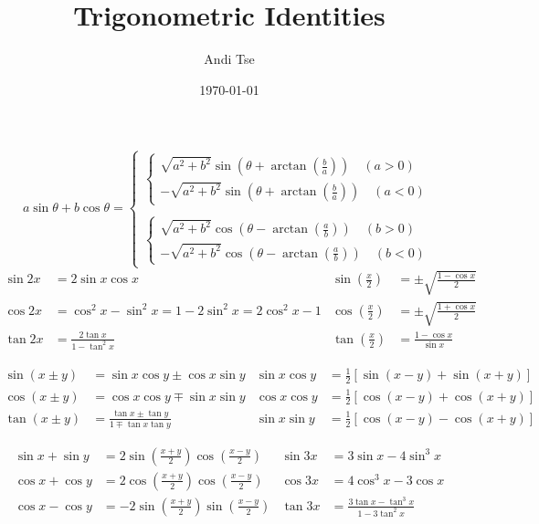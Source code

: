 \documentclass{article}
\title{Trigonometric Identities}
\author{Andi Tse}
\date{\today}
\begin{document}
 \maketitle
 \[a\sin\theta+b\cos\theta=
 \begin{cases}
 \begin{cases}
 
 \sqrt{a^2+b^2}\sin\left(\theta +\arctan\left(\frac ba\right)\right)\quad (a>0)\\
 -\sqrt{a^2+b^2}\sin\left(\theta +\arctan\left(\frac ba\right)\right)\quad (a<0)
 \end{cases}
 \\\\
 \begin{cases}
 
 \sqrt{a^2+b^2}\cos\left(\theta -\arctan\left(\frac ab\right)\right)\quad (b>0)\\
 -\sqrt{a^2+b^2}\cos\left(\theta -\arctan\left(\frac ab\right)\right)\quad (b<0)
 \end{cases}
 \end{cases}
 \]
\begin{align*}
    \sin 2x&=2\sin x\cos x    & \sin\left(\frac x2\right)&=\pm\sqrt{\frac{1-\cos x}{2}}\\
    \cos 2x&=\cos^2x-\sin^2x=1-2\sin^2x=2\cos^2x-1 & \cos\left(\frac x2\right)&=\pm\sqrt{\frac{1+\cos x}{2}}\\
    \tan 2x&=\frac{2\tan x}{1-\tan^2x}&\tan\left(\frac x2\right)&=\frac{1-\cos x}{\sin x}
\end{align*}

\begin{align*}
    \sin(x\pm y)&=\sin x\cos y\pm\cos x\sin y & \sin x\cos y&=\frac 12\left[\sin(x-y)+\sin(x+y)\right]\\
    \cos(x\pm y)&=\cos x\cos y\mp \sin x\sin y&\cos x\cos y&=\frac 12 \left[\cos(x-y)+\cos(x+y)\right]\\
    \tan(x\pm y)&=\frac{\tan x\pm \tan y}{1\mp\tan x\tan y}&
    \sin x\sin y&=\frac 12\left[\cos(x-y)-\cos(x+y)\right]
\end{align*}

\begin{align*}
    \sin x+\sin y&=2\sin\left(\frac{x+y}{2}\right)\cos\left(\frac{x-y}{2}\right) & \sin 3x&=3\sin x-4\sin^3x\\
    \cos x+\cos y&=2\cos\left(\frac{x+y}{2}\right)\cos\left(\frac{x-y}{2}\right)&\cos 3x&=4\cos^3x-3\cos x\\
    \cos x-\cos y&=-2\sin\left(\frac{x+y}{2}\right)\sin\left(\frac{x-y}{2}\right)&\tan 3x&=\frac{3\tan x-\tan^3x}{1-3\tan^2x}
\end{align*}
\end{document}
